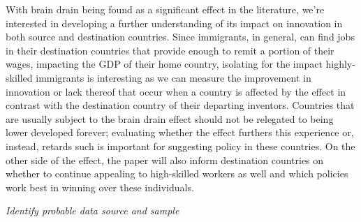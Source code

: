 \documentclass[12pt]{article}
\newcommand{\pointer}[1]{{\color{red} \center \textit{#1}}}
\begin{document}
With brain drain being found as a significant effect in the literature, we're interested in developing a further understanding of its impact on innovation in both source and destination countries.
Since immigrants, in general, can find jobs in their destination countries that provide enough to remit a portion of their wages, impacting the GDP of their home country, isolating for the impact highly-skilled immigrants is interesting as we can measure the improvement in innovation or lack thereof that occur when a country is affected by the effect in contrast with the destination country of their departing inventors.
Countries that are usually subject to the brain drain effect should not be relegated to being lower developed forever; evaluating whether the effect furthers this experience or, instead, retards such is important for suggesting policy in these countries.
On the other side of the effect, the paper will also inform destination countries on whether to continue appealing to high-skilled workers as well and which policies work best in winning over these individuals.





\pointer{Identify probable data source and sample}

\printbibliography
\end{document}
